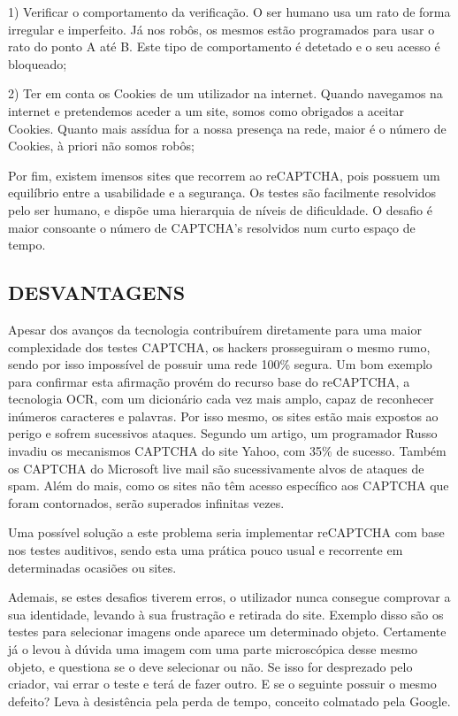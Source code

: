 \documentclass{article}
\begin{document}
  

	1) Verificar o comportamento da verificação. O ser humano usa um rato de forma irregular e imperfeito. Já nos robôs, os mesmos estão programados para usar o rato do ponto A até B. Este tipo de comportamento é detetado e o seu acesso é bloqueado; 

	 

	2) Ter em conta os Cookies de um utilizador na internet. Quando navegamos na internet e pretendemos aceder a um site, somos como obrigados a aceitar Cookies. Quanto mais assídua for a nossa presença na rede, maior é o número de Cookies, à priori não somos robôs; 

 

	Por fim, existem imensos sites que recorrem ao reCAPTCHA, pois possuem um equilíbrio entre a usabilidade e a segurança. Os testes são facilmente resolvidos pelo ser humano, e dispõe uma hierarquia de níveis de dificuldade. O desafio é maior consoante o número de CAPTCHA's resolvidos num curto espaço de tempo. 
	

	
\subsection{DESVANTAGENS}


Apesar dos avanços da tecnologia contribuírem diretamente para uma maior complexidade dos testes CAPTCHA, os hackers prosseguiram o mesmo rumo, sendo por isso impossível de possuir uma rede 100\% segura. Um bom exemplo para confirmar esta afirmação provém do recurso base do reCAPTCHA, a tecnologia OCR, com um dicionário cada vez mais amplo, capaz de reconhecer inúmeros caracteres e palavras. Por isso mesmo, os sites estão mais expostos ao perigo e sofrem sucessivos ataques. Segundo um artigo, um programador Russo invadiu os mecanismos CAPTCHA do site Yahoo, com 35\% de sucesso\cite{2}. Também os CAPTCHA do Microsoft live mail são sucessivamente alvos de ataques de spam. Além do mais, como os sites não têm acesso específico aos CAPTCHA que foram contornados, serão superados infinitas vezes. 

	Uma possível solução a este problema seria implementar reCAPTCHA com base nos testes auditivos, sendo esta uma prática pouco usual e recorrente em determinadas ocasiões ou sites. 

 	Ademais, se estes desafios tiverem erros, o utilizador nunca consegue comprovar a sua identidade, levando à sua frustração e retirada do site. Exemplo disso são os testes para selecionar imagens onde aparece um determinado objeto. Certamente já o levou à dúvida uma imagem com uma parte microscópica desse mesmo objeto, e questiona se o deve selecionar ou não. Se isso for desprezado pelo criador, vai errar o teste e terá de fazer outro. E se o seguinte possuir o mesmo defeito? Leva à desistência pela perda de tempo, conceito colmatado pela Google\cite{7}. 
\end{document}
